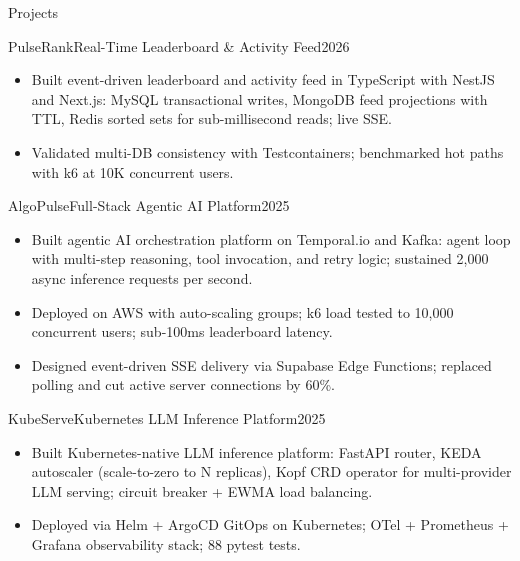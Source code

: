 \documentclass[]{mcdowellcv}
\begin{document}
\begin{cvsection}{Projects}
  \begin{cvsubsection}{PulseRank}{Real-Time Leaderboard \& Activity Feed}{2026}
    \begin{itemize}
      \item Built event-driven leaderboard and activity feed in TypeScript with NestJS and Next.js: MySQL transactional writes, MongoDB feed projections with TTL, Redis sorted sets for sub-millisecond reads; live SSE.
      \item Validated multi-DB consistency with Testcontainers; benchmarked hot paths with k6 at 10K concurrent users.
    \end{itemize}
    \vspace{-1.5pt}
  \end{cvsubsection}

  \begin{cvsubsection}{AlgoPulse}{Full-Stack Agentic AI Platform}{2025}
    \begin{itemize}
      \item Built agentic AI orchestration platform on Temporal.io and Kafka: agent loop with multi-step reasoning, tool invocation, and retry logic; sustained 2,000 async inference requests per second.
      \item Deployed on AWS with auto-scaling groups; k6 load tested to 10,000 concurrent users; sub-100ms leaderboard latency.
      \item Designed event-driven SSE delivery via Supabase Edge Functions; replaced polling and cut active server connections by 60\%.
    \end{itemize}
    \vspace{-1.5pt}
  \end{cvsubsection}

  \begin{cvsubsection}{KubeServe}{Kubernetes LLM Inference Platform}{2025}
    \begin{itemize}
      \item Built Kubernetes-native LLM inference platform: FastAPI router, KEDA autoscaler (scale-to-zero to N replicas), Kopf CRD operator for multi-provider LLM serving; circuit breaker + EWMA load balancing.
      \item Deployed via Helm + ArgoCD GitOps on Kubernetes; OTel + Prometheus + Grafana observability stack; 88 pytest tests.
    \end{itemize}
    \vspace{-1.5pt}
  \end{cvsubsection}
\end{cvsection}
\end{document}
